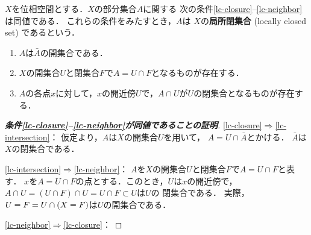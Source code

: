 \begin{leftbar}
\begin{DFN}
    \(X\)を位相空間とする．\(X\)の部分集合\(A\)に関する
    次の条件\eqref{lc-closure}--\eqref{lc-neighbor}は同値である．
    これらの条件をみたすとき，\(A\)は
    \(X\)の\textbf{局所閉集合} (locally closed set) であるという．
    \begin{enumerate}[(1)]
        \item \(A\)は\(\bar{A}\)の開集合である．\label{lc-closure}
        \item \(X\)の開集合\(U\)と閉集合\(F\)で\(A=U\cap F\)となるものが存在する．\label{lc-intersection}
        \item \(A\)の各点\(x\)に対して，\(x\)の開近傍\(U\)で，\(A\cap U\)が\(U\)の閉集合となるものが存在する．\label{lc-neighbor}
    \end{enumerate}
\end{DFN}
\end{leftbar}

\begin{proof}[\textbf{条件\eqref{lc-closure}--\eqref{lc-neighbor}が同値であることの証明}]
    
    \eqref{lc-closure}\(\Rightarrow\)\eqref{lc-intersection}：
    仮定より，\(A\)は\(X\)の開集合\(U\)を用いて，
    \(A=U\cap \bar{A}\)とかける．
    \(\bar{A}\)は\(X\)の閉集合である．

    \eqref{lc-intersection}\(\Rightarrow\)\eqref{lc-neighbor}：
    \(A\)を\(X\)の開集合\(U\)と閉集合\(F\)で\(A=U\cap F\)と表す．
    \(x\)を\(A=U\cap F\)の点とする．このとき，\(U\)は\(x\)の開近傍で，
    \(A\cap U=(U\cap F)\cap U= U\cap F\subset U\)は\(U\)の
    閉集合である．
    実際，\(U\sm F=U\cap (X\sm F)\)は\(U\)の開集合である．

    \eqref{lc-neighbor}\(\Rightarrow\)\eqref{lc-closure}：

\end{proof}

